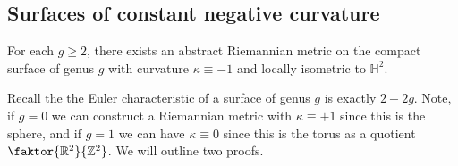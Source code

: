 \subsection{Surfaces of constant negative curvature}
\begin{theorem}
	For each \( g \geq 2 \), there exists an abstract Riemannian metric on the compact surface of genus \( g \) with curvature \( \kappa \equiv -1 \) and locally isometric to \( \mathbb H^2 \).
\end{theorem}
Recall the the Euler characteristic of a surface of genus \( g \) is exactly \( 2 - 2g \).
Note, if \( g = 0 \) we can construct a Riemannian metric with \( \kappa \equiv +1 \) since this is the sphere, and if \( g = 1 \) we can have \( \kappa \equiv 0 \) since this is the torus as a quotient \( \faktor{\mathbb R^2}{\mathbb Z^2} \).
We will outline two proofs.
